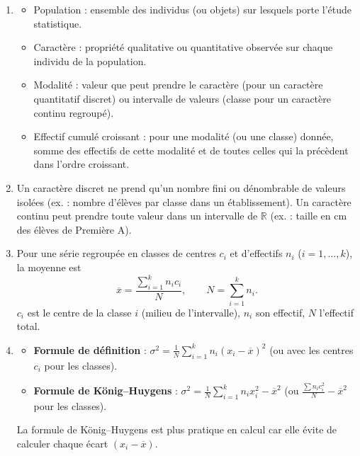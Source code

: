 \documentclass[11pt]{article}
\newcommand{\cle}[1]{{\popxbold\color{popdark}#1}}
\begin{document}
\begin{corrige}
\begin{enumerate}
\item \begin{itemize}
\item \cle{Population} : ensemble des individus (ou objets) sur lesquels porte l'étude statistique.
\item \cle{Caractère} : propriété qualitative ou quantitative observée sur chaque individu de la population.
\item \cle{Modalité} : valeur que peut prendre le caractère (pour un caractère quantitatif discret) ou intervalle de valeurs (classe pour un caractère continu regroupé).
\item \cle{Effectif cumulé croissant} : pour une modalité (ou une classe) donnée, somme des effectifs de cette modalité et de toutes celles qui la précèdent dans l'ordre croissant.
\end{itemize}
\item Un \cle{caractère discret} ne prend qu'un nombre fini ou dénombrable de valeurs isolées (ex. : nombre d'élèves par classe dans un établissement). Un \cle{caractère continu} peut prendre toute valeur dans un intervalle de $\mathbb{R}$ (ex. : taille en cm des élèves de Première A).
\item Pour une série regroupée en classes de centres $c_i$ et d'effectifs $n_i$ ($i=1,\dots,k$), la moyenne est
\[
\overline{x} = \frac{\sum_{i=1}^k n_i c_i}{N}, \qquad N=\sum_{i=1}^k n_i.
\]
$c_i$ est le centre de la classe $i$ (milieu de l'intervalle), $n_i$ son effectif, $N$ l'effectif total.
\item \begin{itemize}
\item \textbf{Formule de définition} : $\displaystyle \sigma^2 = \frac{1}{N}\sum_{i=1}^k n_i (x_i - \overline{x})^2$ (ou avec les centres $c_i$ pour les classes).
\item \textbf{Formule de König–Huygens} : $\displaystyle \sigma^2 = \frac{1}{N}\sum_{i=1}^k n_i x_i^2 - \overline{x}^2$ (ou $\frac{\sum n_i c_i^2}{N} - \overline{x}^2$ pour les classes).
\end{itemize}
La formule de König–Huygens est plus pratique en calcul car elle évite de calculer chaque écart $(x_i-\overline{x})$.
\end{enumerate}
\end{corrige}
\end{document}
